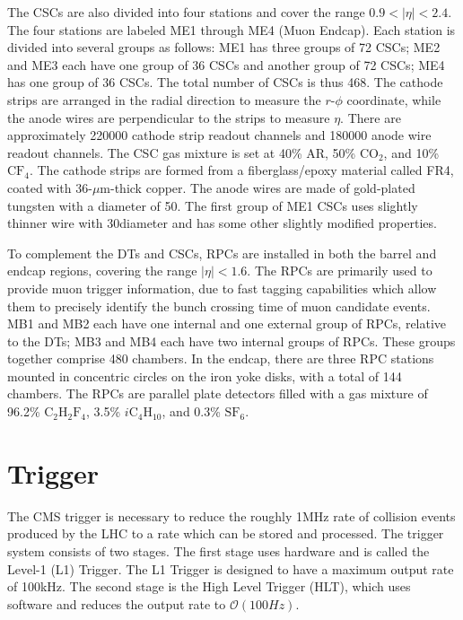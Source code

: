 \documentclass[12pt]{thesis}  %
\begin{document}
The CSCs are also divided into four stations and cover the range $0.9<|\eta|<2.4$. The four stations are labeled ME1 through ME4 (Muon Endcap). Each station is divided into several groups as follows: ME1 has three groups of 72 CSCs; ME2 and ME3 each have one group of 36 CSCs and another group of 72 CSCs; ME4 has one group of 36 CSCs. The total number of CSCs is thus 468. The cathode strips are arranged in the radial direction to measure the $r$-$\phi$ coordinate, while the anode wires are perpendicular to the strips to measure $\eta$. There are approximately 220000 cathode strip readout channels and 180000 anode wire readout channels. The CSC gas mixture is set at 40\% AR, 50\% $\text{CO}_2$, and 10\% $\text{CF}_4$. The cathode strips are formed from a fiberglass/epoxy material called FR4, coated with 36-$\mu$m-thick copper. The anode wires are made of gold-plated tungsten with a diameter of 50\mum. The first group of ME1 CSCs uses slightly thinner wire with 30\mum diameter and has some other slightly modified properties.

To complement the DTs and CSCs, RPCs are installed in both the barrel and endcap regions, covering the range $|\eta|<1.6$. The RPCs are primarily used to provide muon trigger information, due to fast tagging capabilities which allow them to precisely identify the bunch crossing time of muon candidate events. MB1 and MB2 each have one internal and one external group of RPCs, relative to the DTs; MB3 and MB4 each have two internal groups of RPCs. These groups together comprise 480 chambers. In the endcap, there are three RPC stations mounted in concentric circles on the iron yoke disks, with a total of 144 chambers. The RPCs are parallel plate detectors filled with a gas mixture of 96.2\% $\text{C}_2\text{H}_2\text{F}_4$, 3.5\% $i\text{C}_4\text{H}_{10}$, and 0.3\% $\text{SF}_6$.


\section{Trigger}

The CMS trigger is necessary to reduce the roughly 1\unit{MHz} rate of collision events produced by the LHC to a rate which can be stored and processed. The trigger system consists of two stages. The first stage uses hardware and is called the Level-1 (L1) Trigger. The L1 Trigger is designed to have a maximum output rate of 100\unit{kHz}. The second stage is the High Level Trigger (HLT), which uses software and reduces the output rate to $\mathcal{O}(100\unit{Hz})$.
\end{document}
